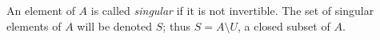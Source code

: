 An element of $A$ is called \textit{singular} if it is not invertible. The set of singular elements of $A$ will be denoted $S$; thus $S = A \setminus U$, a closed subset of $A$.
